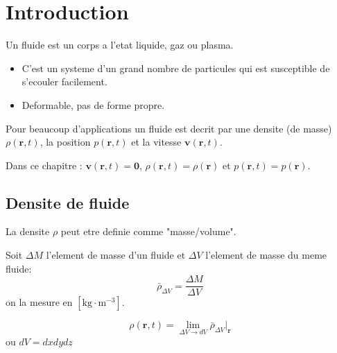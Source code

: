 \section{Introduction}

\begin{definition}
Un fluide est un corps a l'etat liquide, gaz ou plasma.
\begin{itemize}
\item C'est un systeme d'un grand nombre de particules qui est susceptible de s'ecouler facilement.
\item Deformable, pas de forme propre.
\end{itemize}
\end{definition}
\begin{remark}
Pour beaucoup d'applications un fluide est decrit par une densite (de masse) $\rho(\boldsymbol{r},t)$, la position $p(\boldsymbol{r},t)$ et la vitesse $\boldsymbol{v}(\boldsymbol{r},t)$.
\end{remark}

Dans ce chapitre : $\boldsymbol{v}(\boldsymbol{r},t)=\boldsymbol{0}$, $\rho(\boldsymbol{r},t)=\rho(\boldsymbol{r})$ et $p(\boldsymbol{r},t)=p(\boldsymbol{r})$.

\subsection{Densite de fluide}

La densite $\rho$ peut etre definie comme "masse/volume". 
\begin{definition}
Soit $\Delta M$ l'element de masse d'un fluide et $\Delta V$ l'element de masse du meme fluide:
$$
\bar{\rho}_{\Delta V}=\frac{\Delta M}{\Delta V}
$$
on la mesure en $[\mathrm{kg}\cdot \mathrm{m}^{-3}]$.
\end{definition}
\begin{definition}
$$\rho(\boldsymbol{r},t)=\lim_{ \Delta V \to dV }\bar{\rho}_{\Delta V}|_{\boldsymbol{r}}$$
ou $dV=dxdydz$ 
\end{definition}